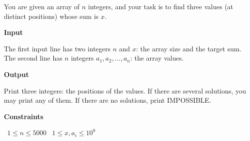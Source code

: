 You are given an array of $n$ integers, and your task is to find three values (at distinct positions) whose sum is $x$.

\vspace{0.3cm}\noindent\textbf{Input}

The first input line has two integers $n$ and $x$: the array size and the target sum.
The second line has $n$ integers $a_1,a_2,\dots,a_n$: the array values.

\vspace{0.3cm}\noindent\textbf{Output}

Print three integers: the positions of the values. If there are several solutions, you may print any of them. If there are no solutions, print IMPOSSIBLE.

\vspace{0.3cm}\noindent\textbf{Constraints}

\textbullet\ $1 \le n \le 5000$
\textbullet\ $1 \le x,a_i \le 10^9$